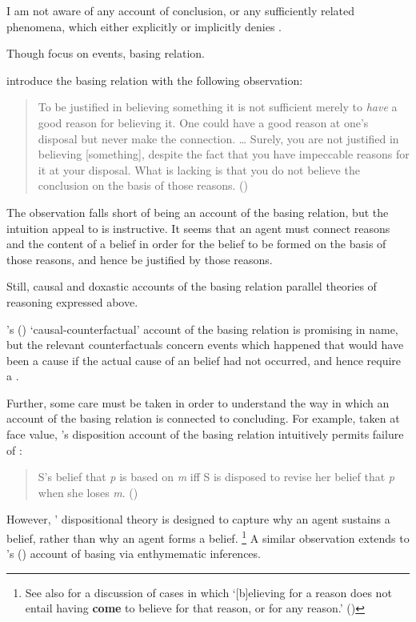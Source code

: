 \begin{note}
  I am not aware of any account of conclusion, or any sufficiently related phenomena, which either explicitly or implicitly denies \issueConstraint{}.
\end{note}

\begin{note}
  Though focus on events, basing relation.

  \citeauthor{Pollock:1999tm} introduce the basing relation with the following observation:
  \begin{quote}
    To be justified in believing something it is not sufficient merely to \emph{have} a good reason for believing it.
    One could have a good reason at one's disposal but never make the connection.
    \dots
    Surely, you are not justified in believing [something], despite the fact that you have impeccable reasons for it at your disposal.
    What is lacking is that you do not believe the conclusion on the basis of those reasons.%
    \mbox{}\hfill\mbox{(\citeyear[35]{Pollock:1999tm})}
  \end{quote}
  The observation falls short of being an account of the basing relation, but the intuition \citeauthor{Pollock:1999tm} appeal to is instructive.
  It seems that an agent must connect reasons and the content of a belief in order for the belief to be formed on the basis of those reasons, and hence be justified by those reasons.

  Still, causal and doxastic accounts of the basing relation parallel theories of reasoning expressed above.

  \citeauthor{Swain:1981wd}'s (\citeyear{Swain:1981wd}) `causal-counterfactual' account of the basing relation is promising in name, but the relevant counterfactuals concern events which happened that would have been a cause if the actual cause of an \agents{} belief had not occurred, and hence require a .

  Further, some care must be taken in order to understand the way in which an account of the basing relation is connected to concluding.
  For example, taken at face value, \citeauthor{Evans:2013tw}'s disposition account of the basing relation intuitively permits failure of \issueConstraint{}:

  \begin{quote}
    S's belief that \emph{p} is based on \emph{m} iff S is disposed to revise her belief that \emph{p} when she loses \emph{m}.%
    \mbox{}\hfill\mbox{(\citeyear[2952]{Evans:2013tw})}
  \end{quote}

  However, \citeauthor{Evans:2013tw}' dispositional theory is designed to capture why an agent sustains a belief, rather than why an agent forms a belief.%
  \footnote{
    See also \textcite{Audi:1986to} for a discussion of cases in which `[b]elieving for a reason does not entail having \textbf{come} to believe for that reason, or for any reason.' (\citeyear[32--33]{Audi:1986to})
  }
  A similar observation extends to \citeauthor{Moretti:2019wx}'s (\citeyear{Moretti:2019wx}) account of basing via enthymematic inferences.
\end{note}


